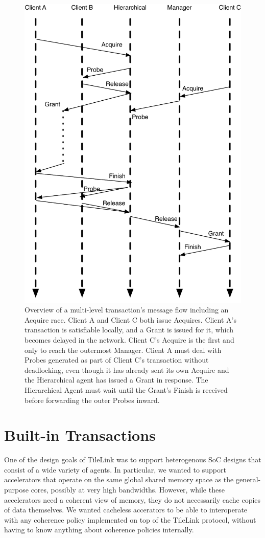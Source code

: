 \begin{figure}[t!]
\centering
\includegraphics[width=0.8\columnwidth]{tilelink/figures/acq-merge-5-2.pdf}
\caption{Overview of a multi-level transaction's message flow including an Acquire race.
Client A and Client C both issue Acquires.
Client A's transaction is satisfiable locally, and a Grant is issued for it, which becomes delayed in the network.
Client C's Acquire is the first and only to reach the outermost Manager.
Client A must deal with Probes generated as part of Client C's transaction without deadlocking, even though it has already sent its own Acquire
and the Hierarchical agent has issued a Grant in response.
The Hierarchical Agent must wait until the Grant's Finish is received before forwarding the outer Probes inward.
}
\label{fig:acq-merge-5-2}
\end{figure}

\section{Built-in Transactions}

One of the design goals of TileLink was to support heterogenous SoC designs that consist of a wide variety of agents.
In particular, we wanted to support accelerators that operate on the same global shared memory space as the general-purpose cores, possibly at very high bandwidths.
However, while these accelerators need a coherent view of memory, they do not necessarily cache copies of data themselves.
We wanted cacheless accerators to be able to interoperate with any coherence policy implemented on top of the TileLink protocol, without having to know anything about coherence policies internally.


